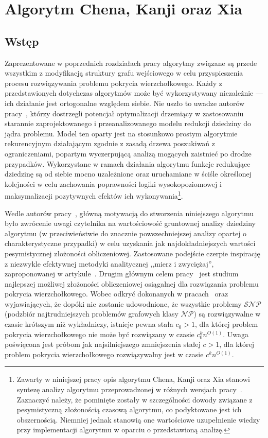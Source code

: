 \section{Algorytm Chena, Kanji oraz Xia}\label{s_ckx}
\subsection{Wstęp}
\par{
  Zaprezentowane w poprzednich rozdziałach pracy algorytmy związane są przede wszystkim z modyfikacją struktury grafu wejściowego w celu przyspieszenia procesu rozwiązywania problemu pokrycia wierzchołkowego.
  Każdy z przedstawionych dotychczas algorytmów może być wykorzystywany niezależnie --- ich działanie jest ortogonalne względem siebie.
  Nie uszło to uwadze autorów pracy~\cite{ImprovedBounds10}, którzy dostrzegli potencjał optymalizacji drzemiący w zastosowaniu starannie zaprojektowanego i przeanalizowanego modelu redukcji dziedziny do jądra problemu.
  Model ten oparty jest na stosunkowo prostym algorytmie rekurencyjnym działającym zgodnie z zasadą drzewa poszukiwań z ograniczeniami, popartym wyczerpującą analizą mogących zaistnieć po drodze przypadków.
  Wykorzystane w ramach działania algorytmu funkcje redukujące dziedzinę są od siebie mocno uzależnione oraz uruchamiane w ściśle określonej kolejności w celu zachowania poprawności logiki wysokopoziomowej i maksymalizacji pozytywnych efektów ich wykonywania\footnote{Zawarty w niniejszej pracy opis algorytmu Chena, Kanji oraz Xia stanowi syntezę analizy algorytmu przeprowadzonej w różnych wersjach pracy~\cite{ImprovedBounds10}. Zaznaczyć należy, że pominięte zostały w szczególności dowody związane z pesymistyczną złożonością czasową algorytmu, co podyktowane jest ich obszernością. Niemniej jednak stanowią one wartościowe uzupełnienie wiedzy przy implementacji algorytmu w oparciu o przedstawioną analizę.}.
}
\par{
  Wedle autorów pracy~\cite{ImprovedBounds10}, główną motywacją do stworzenia niniejszego algorytmu było zwrócenie uwagi czytelnika na wartościowość gruntownej analizy dziedziny algorytmu (w przeciwieństwie do znacznie powszechniejszej analizy opartej o charakterystyczne przypadki) w celu uzyskania jak najdokładniejszych wartości pesymistycznej złożoności obliczeniowej.
  Zastosowane podejście czerpie inspirację z niezwykle efektywnej metodyki analitycznej ,,mierz i zwyciężaj'', zaproponowanej w artykule~\cite{conf/icalp/FominGK05}.
  Drugim głównym celem pracy~\cite{ImprovedBounds10} jest studium najlepszej możliwej złożoności obliczeniowej osiągalnej dla rozwiązania problemu pokrycia wierzchołkowego.
  Wobec odkryć dokonanych w pracach~\cite{Impagliazzo2001512} oraz~\cite{Cai2003789} wyjawiających, że dopóki nie zostanie udowodnione, że wszystkie problemy $\mathcal{SNP}$ (podzbiór najtrudniejszych problemów grafowych klasy $\mathcal{NP}$) są rozwiązywalne w czasie krótszym niż wykładniczy, istnieje pewna stała $c_0 > 1$, dla której problem pokrycia wierzchołkowego nie może być rozwiązany w czasie $c_0^kn^{O(1)}$.
  Uwaga poświęcona jest próbom jak najsilniejszego zmniejszenia stałej $c > 1$, dla której problem pokrycia wierzchołkowego rozwiązywalny jest w czasie $c^kn^{O(1)}$.
}
